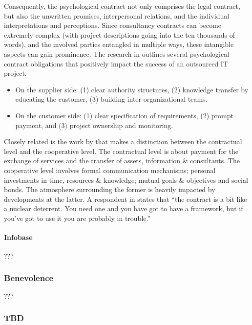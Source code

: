 \documentclass[12pt]{article}
\providecommand{\tightlist}{%
  \setlength{\itemsep}{0pt}\setlength{\parskip}{0pt}}
\begin{document}
Consequently, the psychological contract not only comprises the legal
contract, but also the unwritten promises, interpersonal relations, and
the individual interpretations and perceptions. Since consultancy
contracts can become extremely complex (with project descriptions going
into the ten thousands of words), and the involved parties entangled in
multiple ways, these intangible aspects can gain prominence. The
research in \citet[369-70]{ang2004} outlines several psychological
contract obligations that positively impact the success of an outsourced
IT project.

\begin{itemize}
\tightlist
\item
  On the supplier side: (1) clear authority structures, (2) knowledge
  transfer by educating the customer, (3) building inter-organizational
  teams.
\item
  On the customer side: (1) clear specification of requirements, (2)
  prompt payment, and (3) project ownership and monitoring.
\end{itemize}

Closely related is the work by \citet[9-13]{willcockskern} that makes a
distinction between the contractual level and the cooperative level. The
contractual level is about payment for the exchange of services and the
transfer of assets, information \& consultants. The cooperative level
involves formal communication mechanisms; personal investments in time,
resources \& knowledge; mutual goals \& objectives and social bonds. The
atmosphere surrounding the former is heavily impacted by developments at
the latter. A respondent in \citet[9]{willcockskern} states that ``the
contract is a bit like a nuclear deterrent. You need one and you have
got to have a framework, but if you've got to use it you are probably in
trouble.''

\hypertarget{infobase}{%
\paragraph{Infobase}\label{infobase}}

???

\hypertarget{benevolence}{%
\subsubsection{Benevolence}\label{benevolence}}

???

\hypertarget{tbd}{%
\subsubsection{TBD}\label{tbd}}
\end{document}
